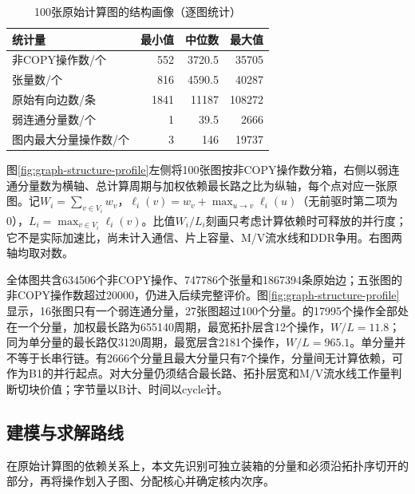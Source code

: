 \begin{table}[H]\centering\small
\caption{100张原始计算图的结构画像（逐图统计）}\label{tab:q1-graph-profile}
\begin{tabular}{lrrr}\toprule
统计量 & 最小值 & 中位数 & 最大值\\\midrule
非COPY操作数/个 & 552 & 3720.5 & 35705\\
张量数/个 & 816 & 4590.5 & 40287\\
原始有向边数/条 & 1841 & 11187 & 108272\\
弱连通分量数/个 & 1 & 39.5 & 2666\\
图内最大分量操作数/个 & 3 & 146 & 19737\\\bottomrule
\end{tabular}\end{table}

图\ref{fig:graph-structure-profile}左侧将100张图按非COPY操作数分箱，右侧以弱连通分量数为横轴、总计算周期与加权依赖最长路之比为纵轴，每个点对应一张原图。记$W_i=\sum_{v\in V_i}w_v$，$\ell_i(v)=w_v+\max_{u\to v}\ell_i(u)$（无前驱时第二项为0），$L_i=\max_{v\in V_i}\ell_i(v)$。比值$W_i/L_i$刻画只考虑计算依赖时可释放的并行度；它不是实际加速比，尚未计入通信、片上容量、M/V流水线和DDR争用。右图两轴均取对数。

全体图共含634506个非COPY操作、747786个张量和1867394条原始边；五张图的非COPY操作数超过20000，仍进入后续完整评价。图\ref{fig:graph-structure-profile}显示，16张图只有一个弱连通分量，27张图超过100个分量。的17995个操作全部处在一个分量，加权最长路为655140周期，最宽拓扑层含12个操作，$W/L=11.8$；同为单分量的最长路仅3120周期，最宽层含2181个操作，$W/L=965.1$。单分量并不等于长串行链。有2666个分量且最大分量只有7个操作，分量间无计算依赖，可作为B1的并行起点。对大分量仍须结合最长路、拓扑层宽和M/V流水线工作量判断切块价值；字节量以B计、时间以cycle计。

\subsection{建模与求解路线}
在原始计算图的依赖关系上，本文先识别可独立装箱的分量和必须沿拓扑序切开的部分，再将操作划入子图、分配核心并确定核内次序。

